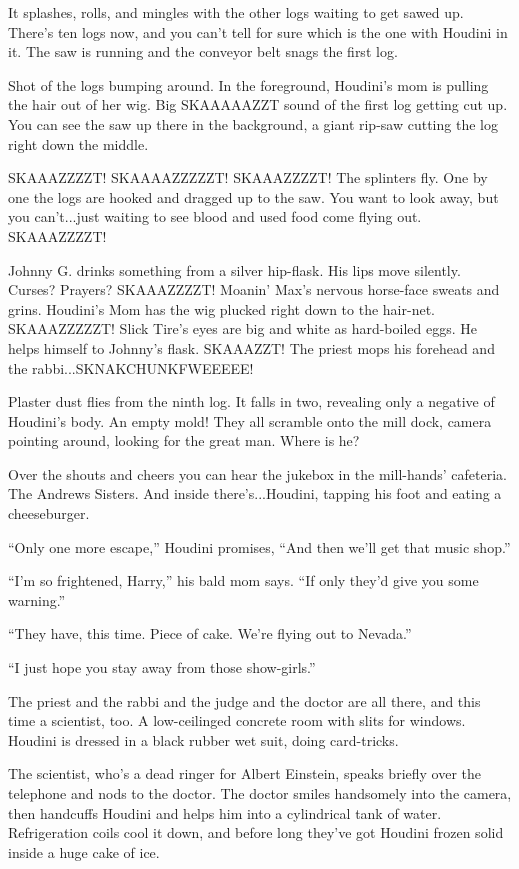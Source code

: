 It splashes, rolls, and mingles with the other logs waiting to get sawed up. There's ten logs now, and you can't tell for sure which is the one with Houdini in it. The saw is running and the conveyor belt snags the first log.

Shot of the logs bumping around. In the foreground, Houdini's mom is pulling the hair out of her wig. Big SKAAAAAZZT sound of the first log getting cut up. You can see the saw up there in the background, a giant rip-saw cutting the log right down the middle.

SKAAAZZZZT! SKAAAAZZZZZT! SKAAAZZZZT! The splinters fly. One by one the logs are hooked and dragged up to the saw. You want to look away, but you can't...just waiting to see blood and used food come flying out. SKAAAZZZZT!

Johnny G. drinks something from a silver hip-flask. His lips move silently. Curses? Prayers? SKAAAZZZZT! Moanin' Max's nervous horse-face sweats and grins. Houdini's Mom has the wig plucked right down to the hair-net. SKAAAZZZZZT! Slick Tire's eyes are big and white as hard-boiled eggs. He helps himself to Johnny's flask. SKAAAZZT! The priest mops his forehead and the rabbi...SKNAKCHUNKFWEEEEE!

Plaster dust flies from the ninth log. It falls in two, revealing only a negative of Houdini's body. An empty mold! They all scramble onto the mill dock, camera pointing around, looking for the great man. Where is he?

Over the shouts and cheers you can hear the jukebox in the mill-hands' cafeteria. The Andrews Sisters. And inside there's...Houdini, tapping his foot and eating a cheeseburger.

``Only one more escape,'' Houdini promises, ``And then we'll get that music shop.''

``I'm so frightened, Harry,'' his bald mom says. ``If only they'd give you some warning.''

``They have, this time. Piece of cake. We're flying out to Nevada.''

``I just hope you stay away from those show-girls.''

The priest and the rabbi and the judge and the doctor are all there, and this time a scientist, too. A low-ceilinged concrete room with slits for windows. Houdini is dressed in a black rubber wet suit, doing card-tricks.

The scientist, who's a dead ringer for Albert Einstein, speaks briefly over the telephone and nods to the doctor. The doctor smiles handsomely into the camera, then handcuffs Houdini and helps him into a cylindrical tank of water. Refrigeration coils cool it down, and before long they've got Houdini frozen solid inside a huge cake of ice.

